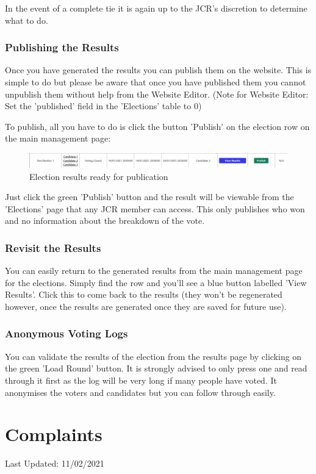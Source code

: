 \documentclass{article}
\begin{document}
In the event of a complete tie it is again up to the JCR's discretion to determine what to do.
\subsubsection{Publishing the Results}
Once you have generated the results you can publish them on the website. This is simple to do but please be aware that once you have published them you cannot unpublish them without help from the Website Editor. (Note for Website Editor: Set the 'published' field in the 'Elections' table to 0)

To publish, all you have to do is click the button 'Publish' on the election row on the main management page:
\begin{figure}[H]
    \centering
    \includegraphics[width=\textwidth,height=\textheight,keepaspectratio]{elections/election_row_publish.png}
    \caption{Election results ready for publication}
    \label{fig:election_publication_ready}
\end{figure}
Just click the green 'Publish' button and the result will be viewable from the 'Elections' page that any JCR member can access. This only publishes who won and no information about the breakdown of the vote. 
\subsubsection{Revisit the Results}
You can easily return to the generated results from the main management page for the elections. Simply find the row and you'll see a blue button labelled 'View Results'. Click this to come back to the results (they won't be regenerated however, once the results are generated once they are saved for future use).
\subsubsection{Anonymous Voting Logs}
You can validate the results of the election from the results page by clicking on the green 'Load Round' button. It is strongly advised to only press one and read through it first as the log will be very long if many people have voted. It anonymises the voters and candidates but you can follow through easily.

\newpage
\section{Complaints}
Last Updated: 11/02/2021
\end{document}
